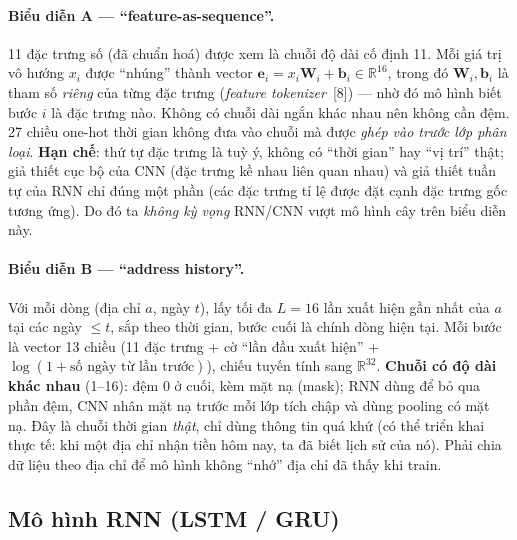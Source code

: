 \paragraph{Biểu diễn A --- ``feature-as-sequence''.} 11 đặc trưng số (đã chuẩn hoá) được xem là chuỗi độ dài cố định 11.
Mỗi giá trị vô hướng $x_i$ được ``nhúng'' thành vector $\mathbf{e}_i=x_i\mathbf{W}_i+\mathbf{b}_i\in\mathbb{R}^{16}$, trong đó
$\mathbf{W}_i,\mathbf{b}_i$ là tham số \emph{riêng} của từng đặc trưng (\emph{feature tokenizer}~[8]) --- nhờ đó mô hình biết
bước $i$ là đặc trưng nào. Không có chuỗi dài ngắn khác nhau nên không cần đệm. 27 chiều one-hot thời gian không đưa vào chuỗi
mà được \emph{ghép vào trước lớp phân loại}. \textbf{Hạn chế}: thứ tự đặc trưng là tuỳ ý, không có ``thời gian'' hay ``vị trí''
thật; giả thiết cục bộ của CNN (đặc trưng kề nhau liên quan nhau) và giả thiết tuần tự của RNN chỉ đúng một phần (các đặc trưng
tỉ lệ được đặt cạnh đặc trưng gốc tương ứng). Do đó ta \emph{không kỳ vọng} RNN/CNN vượt mô hình cây trên biểu diễn này.

\paragraph{Biểu diễn B --- ``address history''.} Với mỗi dòng (địa chỉ $a$, ngày $t$), lấy tối đa $L=16$ lần xuất hiện gần nhất
của $a$ tại các ngày $\le t$, sắp theo thời gian, bước cuối là chính dòng hiện tại. Mỗi bước là vector 13 chiều
(11 đặc trưng + cờ ``lần đầu xuất hiện'' + $\log(1+\text{số ngày từ lần trước})$), chiếu tuyến tính sang $\mathbb{R}^{32}$.
\textbf{Chuỗi có độ dài khác nhau} (1--16): đệm 0 ở cuối, kèm mặt nạ (mask); RNN dùng  để bỏ qua
phần đệm, CNN nhân mặt nạ trước mỗi lớp tích chập và dùng pooling có mặt nạ. Đây là chuỗi thời gian \emph{thật}, chỉ dùng thông
tin quá khứ (có thể triển khai thực tế: khi một địa chỉ nhận tiền hôm nay, ta đã biết lịch sử của nó). Phải chia dữ liệu theo địa
chỉ để mô hình không ``nhớ'' địa chỉ đã thấy khi train.

\subsection{Mô hình RNN (LSTM / GRU)}

